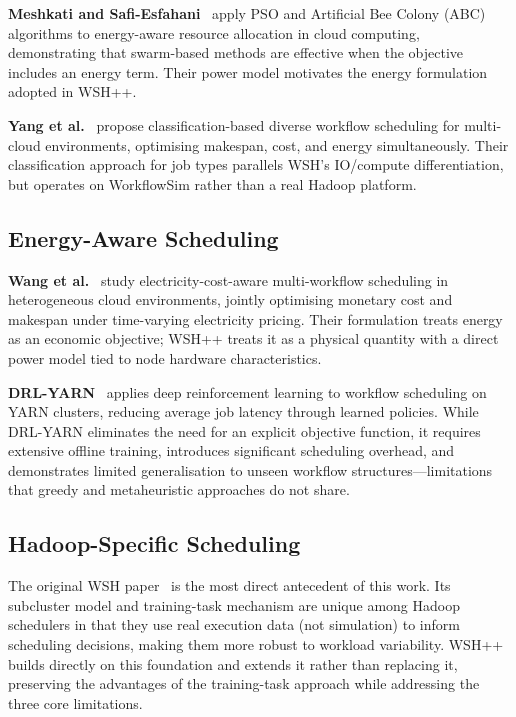 \documentclass[10pt,twocolumn]{article}
\begin{document}
\textbf{Meshkati and Safi-Esfahani}~\cite{pso_cloud} apply PSO and Artificial Bee
Colony (ABC) algorithms to energy-aware resource allocation in cloud computing,
demonstrating that swarm-based methods are effective when the objective includes an
energy term. Their power model motivates the energy formulation adopted in WSH++.

\textbf{Yang et al.}~\cite{yang2022} propose classification-based diverse workflow
scheduling for multi-cloud environments, optimising makespan, cost, and energy
simultaneously. Their classification approach for job types parallels WSH's
IO/compute differentiation, but operates on WorkflowSim rather than a real Hadoop
platform.

\subsection{Energy-Aware Scheduling}

\textbf{Wang et al.}~\cite{wang2024} study electricity-cost-aware multi-workflow
scheduling in heterogeneous cloud environments, jointly optimising monetary cost and
makespan under time-varying electricity pricing. Their formulation treats energy as
an economic objective; WSH++ treats it as a physical quantity with a direct power
model tied to node hardware characteristics.

\textbf{DRL-YARN}~\cite{xue2023} applies deep reinforcement learning to workflow
scheduling on YARN clusters, reducing average job latency through learned policies.
While DRL-YARN eliminates the need for an explicit objective function, it requires
extensive offline training, introduces significant scheduling overhead, and
demonstrates limited generalisation to unseen workflow structures---limitations that
greedy and metaheuristic approaches do not share.

\subsection{Hadoop-Specific Scheduling}

The original WSH paper~\cite{rahmani2025} is the most direct antecedent of this
work. Its subcluster model and training-task mechanism are unique among Hadoop
schedulers in that they use real execution data (not simulation) to inform
scheduling decisions, making them more robust to workload variability. WSH++ builds
directly on this foundation and extends it rather than replacing it, preserving the
advantages of the training-task approach while addressing the three core limitations.
\end{document}
